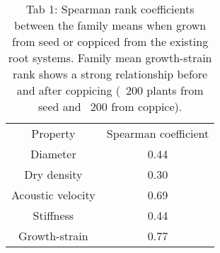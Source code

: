 
\begin{table} 
    \begin{tabular}{ c c }
Property          & Spearman coefficient \\
Diameter          & 0.44                 \\
Dry density       & 0.30                 \\
Acoustic velocity & 0.69                 \\
Stiffness         & 0.44                 \\
Growth-strain     & 0.77  
    \end{tabular} 
    \caption{Tab 1: Spearman rank coefficients between the family means when grown from seed or coppiced from the existing root systems. Family mean growth-strain rank shows a strong relationship before and after coppicing (~200 plants from seed and ~200 from coppice). } 
\end{table}